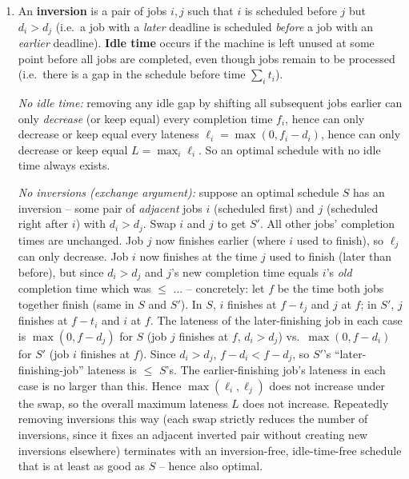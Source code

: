 \documentclass[11pt]{article}
\begin{document}
\begin{enumerate}[label=\textbf{A\arabic*.}, leftmargin=2.2em]
\item An \textbf{inversion} is a pair of jobs $i, j$ such that $i$ is scheduled before
$j$ but $d_i > d_j$ (i.e.\ a job with a \emph{later} deadline is scheduled \emph{before} a
job with an \emph{earlier} deadline). \textbf{Idle time} occurs if the machine is left
unused at some point before all jobs are completed, even though jobs remain to be
processed (i.e.\ there is a gap in the schedule before time $\sum_i t_i$).

\textit{No idle time:} removing any idle gap by shifting all subsequent jobs earlier can
only \emph{decrease} (or keep equal) every completion time $f_i$, hence can only decrease
or keep equal every lateness $\ell_i = \max(0, f_i-d_i)$, hence can only decrease or keep
equal $L = \max_i \ell_i$. So an optimal schedule with no idle time always exists.

\textit{No inversions (exchange argument):} suppose an optimal schedule $S$ has an
inversion -- some pair of \emph{adjacent} jobs $i$ (scheduled first) and $j$ (scheduled
right after $i$) with $d_i > d_j$. Swap $i$ and $j$ to get $S'$. All other jobs' completion
times are unchanged. Job $j$ now finishes earlier (where $i$ used to finish), so
$\ell_j$ can only decrease. Job $i$ now finishes at the time $j$ used to finish (later
than before), but since $d_i > d_j$ and $j$'s new completion time equals $i$'s \emph{old}
completion time which was $\le$ ... -- concretely: let $f$ be the time both jobs together
finish (same in $S$ and $S'$). In $S$, $i$ finishes at $f - t_j$ and $j$ at $f$; in $S'$,
$j$ finishes at $f-t_i$ and $i$ at $f$. The lateness of the later-finishing job in each
case is $\max(0, f-d_j)$ for $S$ (job $j$ finishes at $f$, $d_i>d_j$) vs.\ $\max(0,f-d_i)$
for $S'$ (job $i$ finishes at $f$). Since $d_i > d_j$, $f - d_i < f - d_j$, so $S'$'s
``later-finishing-job'' lateness is $\le$ $S$'s. The earlier-finishing job's lateness in
each case is no larger than this. Hence $\max(\ell_i,\ell_j)$ does not increase under the
swap, so the overall maximum lateness $L$ does not increase. Repeatedly removing
inversions this way (each swap strictly reduces the number of inversions, since it fixes
an adjacent inverted pair without creating new inversions elsewhere) terminates with an
inversion-free, idle-time-free schedule that is at least as good as $S$ -- hence also
optimal.


\end{enumerate}
\end{document}
